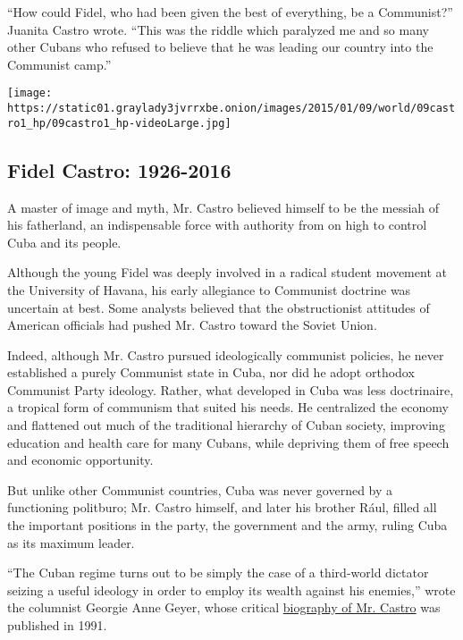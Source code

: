 ``How could Fidel, who had been given the best of everything, be a
Communist?'' Juanita Castro wrote. ``This was the riddle which paralyzed
me and so many other Cubans who refused to believe that he was leading
our country into the Communist camp.''

\href{https://www.nytimes3xbfgragh.onion/interactive/2016/11/26/world/americas/fidel-castro-timeline.html}{}

\texttt{[image: https://static01.graylady3jvrrxbe.onion/images/2015/01/09/world/09castro1\_hp/09castro1\_hp-videoLarge.jpg]}

\hypertarget{fidel-castro-1926-2016}{%
\subsection{Fidel Castro: 1926-2016}\label{fidel-castro-1926-2016}}

A master of image and myth, Mr. Castro believed himself to be the
messiah of his fatherland, an indispensable force with authority from on
high to control Cuba and its people.

Although the young Fidel was deeply involved in a radical student
movement at the University of Havana, his early allegiance to Communist
doctrine was uncertain at best. Some analysts believed that the
obstructionist attitudes of American officials had pushed Mr. Castro
toward the Soviet Union.

Indeed, although Mr. Castro pursued ideologically communist policies, he
never established a purely Communist state in Cuba, nor did he adopt
orthodox Communist Party ideology. Rather, what developed in Cuba was
less doctrinaire, a tropical form of communism that suited his needs. He
centralized the economy and flattened out much of the traditional
hierarchy of Cuban society, improving education and health care for many
Cubans, while depriving them of free speech and economic opportunity.

But unlike other Communist countries, Cuba was never governed by a
functioning politburo; Mr. Castro himself, and later his brother Rául,
filled all the important positions in the party, the government and the
army, ruling Cuba as its maximum leader.

``The Cuban regime turns out to be simply the case of a third-world
dictator seizing a useful ideology in order to employ its wealth against
his enemies,'' wrote the columnist Georgie Anne Geyer, whose critical
\href{http://www.nytimes3xbfgragh.onion/1991/02/10/books/the-last-stalinist.html}{biography
of Mr. Castro} was published in 1991.

